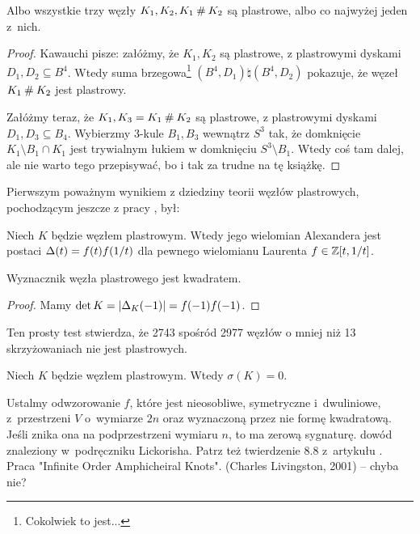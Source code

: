 \begin{proposition}
    Albo wszystkie trzy węzły $K_1, K_2, K_1 \mathbin{\#} K_2$ są plastrowe, albo co najwyżej jeden z~nich.
\end{proposition}

\begin{proof}
    Kawauchi \cite[s. 155]{kawauchi96} pisze: załóżmy, że $K_1, K_2$ są plastrowe, z plastrowymi dyskami $D_1, D_2 \subseteq B^4$.
    Wtedy suma brzegowa\footnote{Cokolwiek to jest...} $(B^4, D_1) \natural (B^4, D_2)$ pokazuje, że węzeł $K_1 \mathbin{\#} K_2$ jest plastrowy.

    Załóżmy teraz, że $K_1, K_3 = K_1 \mathbin{\#} K_2$ są plastrowe, z plastrowymi dyskami $D_1, D_3 \subseteq B_4$.
    Wybierzmy 3-kule $B_1, B_3$ wewnątrz $S^3$ tak, że domknięcie $K_1 \setminus B_1 \cap K_1$ jest trywialnym łukiem w domknięciu $S^3 \setminus B_1$.
    Wtedy coś tam dalej, ale nie warto tego przepisywać, bo i tak za trudne na tę książkę.
\end{proof}


Pierwszym poważnym wynikiem z dziedziny teorii węzłów plastrowych, pochodzącym jeszcze z pracy \cite{fox66}, był:

\begin{proposition}
%
    Niech $K$ będzie węzłem plastrowym.
    Wtedy jego wielomian Alexandera jest postaci $\Delta(t) = f(t) f(1/t)$ dla pewnego wielomianu Laurenta $f \in \mathbb Z[t, 1/t]$.
\end{proposition}

\begin{corollary}
    Wyznacznik węzła plastrowego jest kwadratem.
\end{corollary}

\begin{proof}
    Mamy $\det K = |\Delta_K(-1)| = f(-1) f(-1)$.
\end{proof}

Ten prosty test stwierdza, że 2743 spośród 2977 węzłów o mniej niż 13 skrzyżowaniach nie jest plastrowych.


\begin{proposition}
%
    Niech $K$ będzie węzłem plastrowym.
    Wtedy $\sigma(K) = 0$.
\end{proposition}

\begin{tobedone}
    Ustalmy odwzorowanie $f$, które jest nieosobliwe, symetryczne i~dwuliniowe, z~przestrzeni $V$ o~wymiarze $2n$ oraz wyznaczoną przez nie formę kwadratową.
    Jeśli znika ona na podprzestrzeni wymiaru $n$, to ma zerową sygnaturę.
    dowód znaleziony w~podręczniku Lickorisha.
    Patrz też twierdzenie 8.8 z~artykułu \cite{murasugi65}.
    Praca "Infinite Order Amphicheiral Knots". (Charles Livingston, 2001) -- chyba nie?
\end{tobedone}


